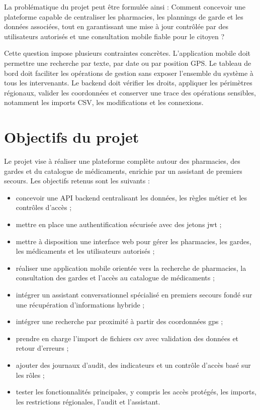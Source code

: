 La problématique du projet peut être formulée ainsi : \og Comment concevoir une plateforme capable de
centraliser les pharmacies, les plannings de garde et les données associées, tout en garantissant une mise
à jour contrôlée par des utilisateurs autorisés et une consultation mobile fiable pour le citoyen ?\fg{}

Cette question impose plusieurs contraintes concrètes. L'application mobile doit permettre une recherche par
texte, par date ou par position GPS. Le tableau de bord doit faciliter les opérations de gestion sans
exposer l'ensemble du système à tous les intervenants. Le backend doit vérifier les droits, appliquer les
périmètres régionaux, valider les coordonnées et conserver une trace des opérations sensibles, notamment les
imports CSV, les modifications et les connexions.

\section*{Objectifs du projet}

Le projet vise à réaliser une plateforme complète autour des pharmacies, des gardes et du catalogue de
médicaments, enrichie par un assistant de premiers secours. Les objectifs retenus sont les suivants :

\begin{itemize}
    \item concevoir une API backend centralisant les données, les règles métier et les contrôles d'accès ;
    \item mettre en place une authentification sécurisée avec des jetons \gls{jwt} ;
    \item mettre à disposition une interface web pour gérer les pharmacies, les gardes, les médicaments et les utilisateurs autorisés ;
    \item réaliser une application mobile orientée vers la recherche de pharmacies, la consultation des gardes et l'accès au catalogue de médicaments ;
    \item intégrer un assistant conversationnel spécialisé en premiers secours fondé sur une récupération d'informations hybride ;
    \item intégrer une recherche par proximité à partir des coordonnées \gls{gps} ;
    \item prendre en charge l'import de fichiers \gls{csv} avec validation des données et retour d'erreurs ;
    \item ajouter des journaux d'audit, des indicateurs et un contrôle d'accès basé sur les rôles ;
    \item tester les fonctionnalités principales, y compris les accès protégés, les imports, les restrictions régionales, l'audit et l'assistant.
\end{itemize}

